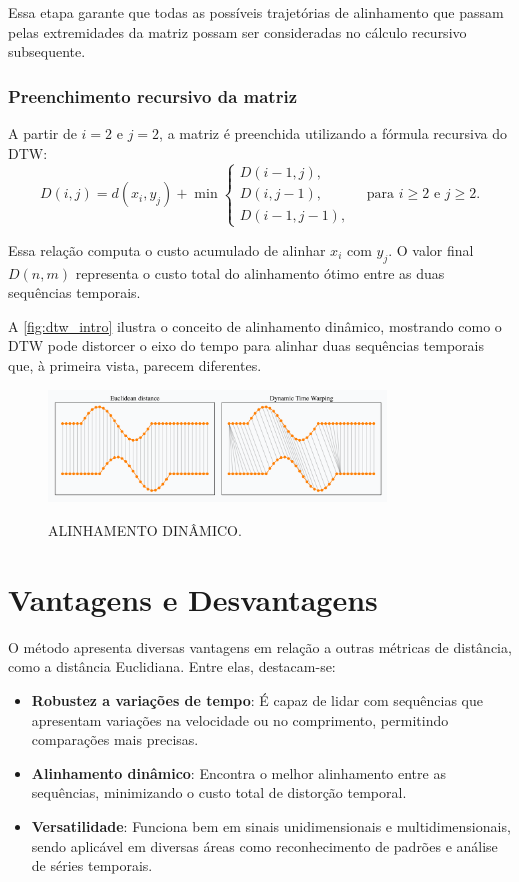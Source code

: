 Essa etapa garante que todas as possíveis trajetórias de alinhamento que passam pelas extremidades da matriz possam ser consideradas no cálculo recursivo subsequente.

\subsubsection*{Preenchimento recursivo da matriz}

A partir de \(i = 2\) e \(j = 2\), a matriz é preenchida utilizando a fórmula recursiva do DTW:
\begin{equation}
    D(i, j) = d(x_i, y_j) + \min \begin{cases}
        D(i-1, j), \\
        D(i, j-1), \\
        D(i-1, j-1),
    \end{cases}
    \quad \text{para } i \geq 2 \text{ e } j \geq 2.
\end{equation}

Essa relação computa o custo acumulado de alinhar \(x_i\) com \(y_j\). O valor final \(D(n, m)\) representa o custo total do alinhamento ótimo entre as duas sequências temporais.


A \autoref{fig:dtw_intro} ilustra o conceito de alinhamento dinâmico, mostrando como o DTW pode distorcer o eixo do tempo para alinhar duas sequências temporais que, à primeira vista, parecem diferentes.

\begin{figure}[h!]
    \centering
    \caption{ALINHAMENTO DINÂMICO.}
    \includegraphics[width=0.8\textwidth]{fig/dtw_vs_euc.png}
    \label{fig:dtw_intro}
\end{figure}

\section{Vantagens e Desvantagens}

O método apresenta diversas vantagens em relação a outras métricas de distância, como a distância Euclidiana. Entre elas, destacam-se:
\begin{itemize}
    \item \textbf{Robustez a variações de tempo}: É capaz de lidar com sequências que apresentam variações na velocidade ou no comprimento, permitindo comparações mais precisas.
    \item \textbf{Alinhamento dinâmico}: Encontra o melhor alinhamento entre as sequências, minimizando o custo total de distorção temporal.
    \item \textbf{Versatilidade}: Funciona bem em sinais unidimensionais e multidimensionais, sendo aplicável em diversas áreas como reconhecimento de padrões e análise de séries temporais.
\end{itemize}

